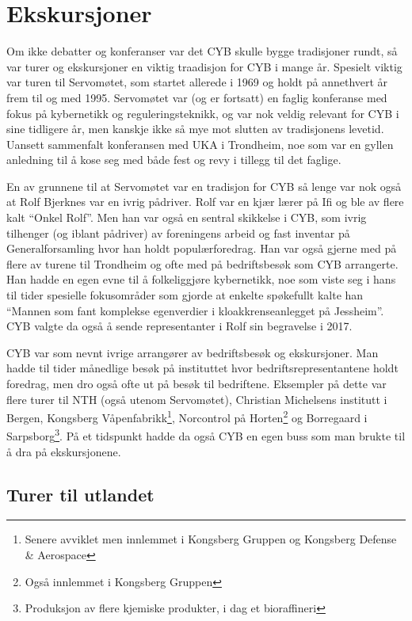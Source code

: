 \section{Ekskursjoner}

Om ikke debatter og konferanser var det CYB skulle bygge tradisjoner rundt, så var turer og ekskursjoner en viktig traadisjon for CYB i mange år. Spesielt viktig var turen til Servomøtet, som startet allerede i 1969 og holdt på annethvert år frem til og med 1995. Servomøtet var (og er fortsatt) en faglig konferanse med fokus på kybernetikk og reguleringsteknikk, og var nok veldig relevant for CYB i sine tidligere år, men kanskje ikke så mye mot slutten av tradisjonens levetid. Uansett sammenfalt konferansen med UKA i Trondheim, noe som var en gyllen anledning til å kose seg med både fest og revy i tillegg til det faglige.

En av grunnene til at Servomøtet var en tradisjon for CYB så lenge var nok også at Rolf Bjerknes var en ivrig pådriver. Rolf var en kjær lærer på Ifi og ble av flere kalt ``Onkel Rolf''. Men han var også en sentral skikkelse i CYB, som ivrig tilhenger (og iblant pådriver) av foreningens arbeid og fast inventar på Generalforsamling hvor han holdt populærforedrag. Han var også gjerne med på flere av turene til Trondheim og ofte med på bedriftsbesøk som CYB arrangerte. Han hadde en egen evne til å folkeliggjøre kybernetikk, noe som viste seg i hans til tider spesielle fokusområder som gjorde at enkelte spøkefullt kalte han ``Mannen som fant komplekse egenverdier i kloakkrenseanlegget på Jessheim''. CYB valgte da også å sende representanter i Rolf sin begravelse i 2017.

CYB var som nevnt ivrige arrangører av bedriftsbesøk og ekskursjoner. Man hadde til tider månedlige besøk på instituttet hvor bedriftsrepresentantene holdt foredrag, men dro også ofte ut på besøk til bedriftene. Eksempler på dette var flere turer til NTH (også utenom Servomøtet), Christian Michelsens institutt i Bergen, Kongsberg Våpenfabrikk\footnote{Senere avviklet men innlemmet i Kongsberg Gruppen og Kongsberg Defense \& Aerospace}, Norcontrol på Horten\footnote{Også innlemmet i Kongsberg Gruppen} og Borregaard i Sarpsborg\footnote{Produksjon av flere kjemiske produkter, i dag et bioraffineri}. På et tidspunkt hadde da også CYB en egen buss som man brukte til å dra på ekskursjonene.

\subsection{Turer til utlandet}

